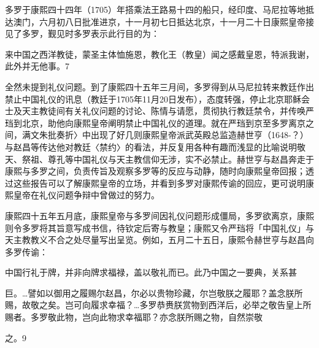 多罗于康熙四十四年（1705）年搭乘法王路易十四的船只，经印度、马尼拉等地抵达澳门，六月初八日批准进京，十一月初七日抵达北京，十一月二十日康熙皇帝接见了多罗，觐见时多罗表示此行目的为：

\begin{BookQuote}
来中国之西洋教徒，蒙圣主体恤施恩，教化王（教皇）闻之感戴皇恩，特派我谢，此外并无他事。7
\end{BookQuote}

全然未提到礼仪问题。到了康熙四十五年三月间，多罗得到从马尼拉转来教廷作出禁止中国礼仪的讯息（教廷于1705年11月20日发布），态度转强，停止北京耶稣会士及天主教徒间有关礼仪问题的讨论、陈情与请愿，贯彻执行教廷禁令，并传唤严珰到北京，助他向康熙皇帝阐明禁止中国礼仪的道理。就在严珰到京至多罗离京之间，满文朱批奏折〉中出现了好几则康熙皇帝派武英殿总监造赫世亨（1648-？）与赵昌等传达他对教廷〈禁约〉的看法，并反复用各种有趣而浅显的比喻说明敬天、祭祖、尊孔等中国礼仪与天主教信仰无涉，实不必禁止。赫世亨与赵昌奔走于康熙与多罗之间，负责传旨及观察多罗等的反应与动静，随时向康熙皇帝回报；透过这些报告可以了解康熙皇帝的立场，并看到多罗对康熙传谕的回应，更可说明康熙皇帝在礼仪问题争辩中曾做过的努力。

康熙四十五年五月底，康熙皇帝与多罗间因礼仪问题形成僵局，多罗欲离京，康熙则令多罗将其旨意写成书信，待钦定后寄与教皇；康熙又令严珰将「中国礼仪」与天主教教义不合之处尽量写出呈览。例如，五月二十五日，康熙令赫世亨与赵昌向多罗传谕：

\begin{BookQuote}
中国行礼于牌，并非向牌求福禄，盖以敬礼而已。此乃中国之一要典，关系甚
\end{BookQuote}

\vfill
\begin{BookNotes}
\end{BookNotes}

\begin{BookQuote}
巨。…譬如以御用之履赐尔赵昌，尔必以贵物珍藏，尔岂敬朕之履耶？盖念朕所赐，故敬之矣。岂可向履求幸福？…多罗恭赉朕赏物到西洋后，必举之敬告皇上所赐者。多罗敬此物，岂向此物求幸福耶？亦念朕所赐之物，自然崇敬
\end{BookQuote}

之。9

